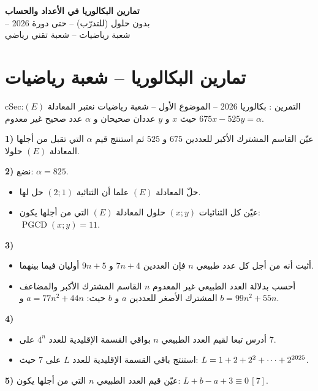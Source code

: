 \documentclass[12pt,a4paper]{article}
\newenvironment{BOX}[2]{\begin{otherlanguage}{english}\begin{arbox}{#1}{#2}}{\end{arbox}\end{otherlanguage}}
\newcounter{exo}
\newenvironment{tamrin}[1]{\stepcounter{exo}\begin{BOX}{cSec}{التمرين \theexo: #1}}{\end{BOX}}
\newenvironment{LTR}{\begin{otherlanguage}{english}}{\end{otherlanguage}}
\renewcommand{\cdots}{\mathinner{\cdotp\cdotp\cdotp}}
\newcommand{\pgcd}{\operatorname{PGCD}}
\newenvironment{sq}{\begin{itemize}[leftmargin=2.4em,itemsep=3pt]}{\end{itemize}}
\newcommand{\qa}{\item[(أ)]}\newcommand{\qb}{\item[(ب)]}\newcommand{\qc}{\item[(جـ)]}\newcommand{\qd}{\item[(د)]}\newcommand{\qe}{\item[(هـ)]}
\begin{document}
\begin{LTR}
\begin{tcolorbox}[enhanced,colback=cSec,colframe=cSec,arc=3mm,halign=center,boxrule=0pt,top=12pt,bottom=12pt,before upper={\selectlanguage{arabic}}]
{\color{white}\fontsize{26}{32}\selectfont\bfseries تمارين البكالوريا في الأعداد والحساب}\\[8pt]
{\color{white}\large -- بدون حلول (للتدرّب) -- حتى دورة 2026}\\[5pt]
{\color{white}\large شعبة رياضيات -- شعبة تقني رياضي}
\end{tcolorbox}
\end{LTR}
\section{تمارين البكالوريا -- شعبة رياضيات}
\begin{tamrin}{بكالوريا 2026 -- الموضوع الأول -- شعبة رياضيات}
نعتبر المعادلة $(E)$: \quad $675x-525y=\alpha$ حيث $x$ و $y$ عددان صحيحان و $\alpha$ عدد صحيح غير معدوم.

\textbf{1)} عيّن القاسم المشترك الأكبر للعددين $675$ و $525$ ثم استنتج قيم $\alpha$ التي تقبل من أجلها المعادلة $(E)$ حلولا.

\textbf{2)} نضع: $\alpha=825$.
\begin{sq}
\qa حلّ المعادلة $(E)$ علما أن الثنائية $(2;1)$ حل لها.
\qb عيّن كل الثنائيات $(x;y)$ حلول المعادلة $(E)$ التي من أجلها يكون: $\pgcd(x;y)=11$.
\end{sq}
\textbf{3)}
\begin{sq}
\qa أثبت أنه من أجل كل عدد طبيعي $n$ فإن العددين $7n+4$ و $9n+5$ أوليان فيما بينهما.
\qb أحسب بدلالة العدد الطبيعي غير المعدوم $n$ القاسم المشترك الأكبر والمضاعف المشترك الأصغر للعددين $a$ و $b$ حيث: $a=77n^2+44n$ و $b=99n^2+55n$.
\end{sq}
\textbf{4)}
\begin{sq}
\qa أدرس تبعا لقيم العدد الطبيعي $n$ بواقي القسمة الإقليدية للعدد $4^n$ على $7$.
\qb استنتج باقي القسمة الإقليدية للعدد $L$ على $7$ حيث: $L=1+2+2^2+\cdots+2^{2025}$.
\end{sq}
\textbf{5)} عيّن قيم العدد الطبيعي $n$ التي من أجلها يكون: $L+b-a+3\equiv 0\,[7]$.
\end{tamrin}
\end{document}

